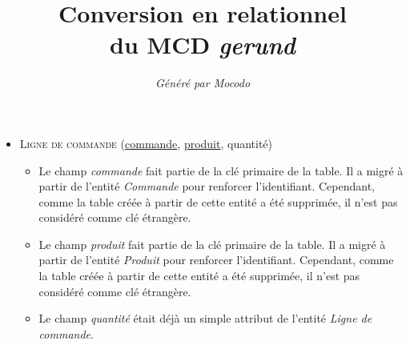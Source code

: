 \documentclass[a4paper]{article}
\title{Conversion en relationnel\\du MCD \emph{gerund}}
\author{\emph{Généré par Mocodo}}
\newcommand{\relat}[1]{\textsc{#1}}
\newcommand{\attr}[1]{#1}
\newcommand{\prim}[1]{\uline{#1}}
\begin{document}
\maketitle

\begin{itemize}
  \item \relat{Ligne de commande} (\prim{commande}, \prim{produit}, \attr{quantité})
  \begin{itemize}
    \item Le champ \emph{commande} fait partie de la clé primaire de la table. Il a migré à partir de l'entité \emph{Commande} pour renforcer l'identifiant. Cependant, comme la table créée à partir de cette entité a été supprimée, il n'est pas considéré comme clé étrangère.
    \item Le champ \emph{produit} fait partie de la clé primaire de la table. Il a migré à partir de l'entité \emph{Produit} pour renforcer l'identifiant. Cependant, comme la table créée à partir de cette entité a été supprimée, il n'est pas considéré comme clé étrangère.
    \item Le champ \emph{quantité} était déjà un simple attribut de l'entité \emph{Ligne de commande}.
  \end{itemize}

\end{itemize}
\end{document}
